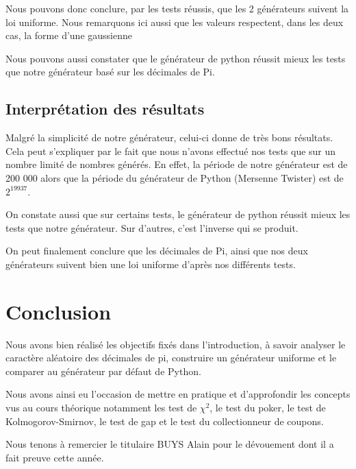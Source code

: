 \documentclass[10pt,a4paper]{article}
\begin{document}
    
Nous pouvons donc conclure, par les tests réussis, que les 2 générateurs suivent la loi uniforme. Nous remarquons ici aussi que les valeurs respectent, dans les deux cas, la forme d'une gaussienne

Nous pouvons aussi constater que le générateur de python réussit mieux les tests que notre générateur basé sur les décimales de Pi. 
  	
	\newpage
	\subsection{Interprétation des résultats}
	Malgré la simplicité de notre générateur, celui-ci donne de très bons résultats.
	Cela peut s'expliquer par le fait que nous n'avons effectué nos tests que sur un nombre limité de nombres générés. 
	En effet, la période de notre générateur est de 200 000 alors que la période du générateur de Python (Mersenne Twister) est de $2^{19937}$.
	
	On constate aussi que sur certains tests, le générateur de python réussit mieux les tests que notre générateur. Sur d'autres, c'est l'inverse qui se produit.
	
	
	On peut finalement conclure que les décimales de Pi, ainsi que nos deux générateurs suivent bien une loi uniforme d'après nos différents tests.	
	
	
	\section{Conclusion}
	Nous avons bien réalisé les objectifs fixés dans l'introduction, à savoir analyser le caractère aléatoire des décimales de pi, construire un générateur uniforme et le comparer au générateur par défaut de Python.
	
	Nous avons ainsi eu l'occasion de mettre en pratique et d'approfondir les concepts vus au cours théorique notamment les test de $\chi^2$, le test du poker, le test de Kolmogorov-Smirnov, le test de gap et le test du collectionneur de coupons.
	
	Nous tenons à remercier le titulaire BUYS Alain pour le dévouement dont il a fait preuve cette année.
	
\end{document}

